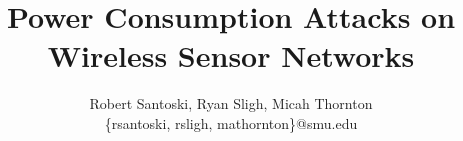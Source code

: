 \title{Power Consumption Attacks on Wireless Sensor Networks}
\author{Robert Santoski, Ryan Sligh, Micah Thornton \\ \small{\{rsantoski, rsligh, mathornton\}@smu.edu}}
\maketitle
